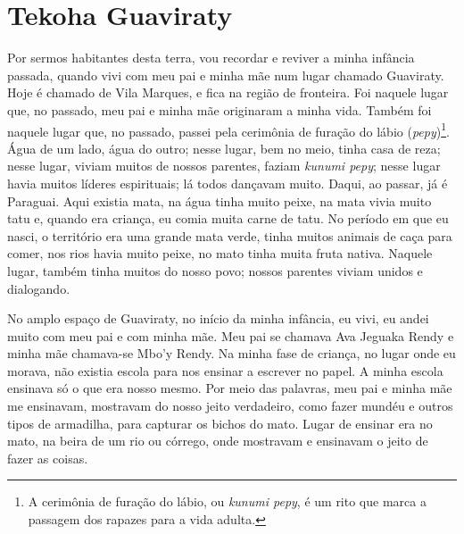 
\chapter*{Tekoha Guaviraty\smallskip{}}

Por sermos habitantes desta terra, vou recordar e reviver a minha
infância passada, quando vivi com meu pai e minha mãe num lugar chamado
Guaviraty. Hoje é chamado de Vila Marques, e fica na região de fronteira.
Foi naquele lugar que, no passado, meu pai e minha mãe originaram a
minha vida. Também foi naquele lugar que, no passado, passei pela
cerimônia de furação do lábio (\emph{pepy})\footnote{A cerimônia de furação do lábio, ou \emph{kunumi pepy}, é um rito que marca a passagem dos rapazes para a vida adulta.}. Água de um lado, água do outro; nesse lugar, bem no meio, tinha casa de reza; nesse lugar, viviam
muitos de nossos parentes, faziam \emph{kunumi pepy}; nesse lugar havia
muitos líderes espirituais; lá todos dançavam muito. Daqui, ao passar,
já é Paraguai. Aqui existia mata, na água tinha muito peixe, na mata
vivia muito tatu e, quando era criança, eu comia muita carne de tatu. No
período em que eu nasci, o território era uma grande mata verde, tinha
muitos animais de caça para comer, nos rios havia muito peixe, no mato
tinha muita fruta nativa. Naquele lugar, também tinha muitos do nosso
povo; nossos parentes viviam unidos e dialogando.

No amplo espaço de Guaviraty, no início da minha infância, eu vivi, eu
andei muito com meu pai e com minha mãe. Meu pai se chamava Ava Jeguaka
Rendy e minha mãe chamava-se Mbo'y Rendy. Na minha fase de criança, no
lugar onde eu morava, não existia escola para nos ensinar a escrever no
papel. A minha escola ensinava só o que era nosso mesmo. Por meio das
palavras, meu pai e minha mãe me ensinavam, mostravam do nosso jeito
verdadeiro, como fazer mundéu e outros tipos de armadilha, para capturar
os bichos do mato. Lugar de ensinar era no mato, na beira de um rio ou
córrego, onde mostravam e ensinavam o jeito de fazer as coisas.

